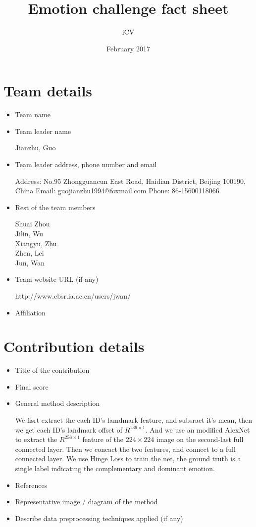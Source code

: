 \documentclass{article}
\title{Emotion challenge fact sheet}
\author{iCV}
\date{February 2017}
\begin{document}
\maketitle

\section{Team details}

\begin{itemize}
\item Team name 
                              
\item Team leader name                           

Jianzhu, Guo
\item Team leader address, phone number and email 

Address: No.95 Zhongguancun East Road, Haidian District, Beijing 100190, China
Email: guojianzhu1994@foxmail.com
Phone: 86-15600118066
\item Rest of the team members      

Shuai Zhou \\
Jilin, Wu \\
Xiangyu, Zhu \\
Zhen, Lei \\
Jun, Wan
\item Team website URL (if any)                   

http://www.cbsr.ia.ac.cn/users/jwan/
\item Affiliation
\end{itemize}

\section{Contribution details}

\begin{itemize}
\item Title of the contribution                                  
\item Final score                                               
\item General method description     

We fisrt extract the each ID's lamdmark feature, and subsract it's mean, then we get each ID's landmark offset of $R^{136\times1}$. And we use an modified AlexNet to extract the $R^{256\times1}$ feature of the $224\times224$ image on the second-last full connected layer. Then we concact the two features, and connect to a full connected layer. We use Hinge Loss to train the net, the ground truth is a single label indicating the complementary and dominant emotion.
\item References                                               
\item Representative image / diagram of the method             
\item Describe data preprocessing techniques applied (if any)   
\end{itemize}
\end{document}
